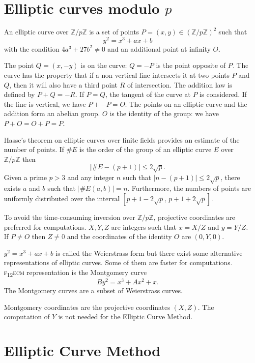 \documentclass[a4paper, 11pt, pdftex]{report}
\theoremstyle{plain}
\theoremstyle{definition}
\begin{document}
\chapter{Elliptic curves modulo $p$}

An elliptic curve over $\mathbb{Z}/p\mathbb{Z}$ is a set of points
$P = (x, y) \in (\mathbb{Z}/p\mathbb{Z})^2$ such that
$$y^2 = x^3 + ax + b$$
with the condition $4a^3 + 27b^2 \neq 0$ and an additional point at infinity $O$.

The point $Q = (x, -y)$ is on the curve: $Q = -P$ is the point opposite of $P$.
The curve has the property that if a non-vertical line intersects it at two points $P$ and $Q$,
then it will also have a third point $R$ of intersection. The addition law is defined
by $P + Q = -R$. If $P = Q$, the tangent of the curve at $P$ is considered.
If the line is vertical, we have $P + -P = O$.
The points on an elliptic curve and the addition form an abelian group.
$O$ is the identity of the group: we have $P + O = O + P = P$.

Hasse's theorem on elliptic curves over finite fields provides an estimate of the number of
points. If $\#E$ is the order of the group of an elliptic curve $E$ over $\mathbb{Z}/p\mathbb{Z}$
then
$$|\#E - (p + 1) | \le 2\sqrt{p}.$$
Given a prime $p > 3$ and any integer $n$ such that $|n - (p + 1)| \le 2\sqrt{p}$, there exists
$a$ and $b$ such that $|\#E(a, b)| = n$. Furthermore, the numbers of points are uniformly
distributed over the interval $[p + 1 - 2\sqrt{p},\, p + 1 + 2\sqrt{p}]$.

To avoid the time-consuming inversion over $\mathbb{Z}/p\mathbb{Z}$, projective coordinates
are preferred for computations. $X, Y, Z$ are integers such that $x = X/Z$ and $y = Y/Z$.
If $P \neq O$ then $Z \neq 0$ and the coordinates of the identity $O$ are $(0, Y, 0)$.

$y^2 = x^3 + ax + b$ is called the Weierstrass form but there exist some alternative representations
of elliptic curves. Some of them are faster for computations.
{\scshape f\textsubscript{12}ecm} representation is the Montgomery curve
$$By^2 = x^3 + Ax^2 + x.$$
The Montgomery curves are a subset of Weierstrass curves.

Montgomery coordinates are the projective coordinates $(X, Z)$. The computation of $Y$
is not needed for the Elliptic Curve Method.

\chapter{Elliptic Curve Method}
\end{document}
